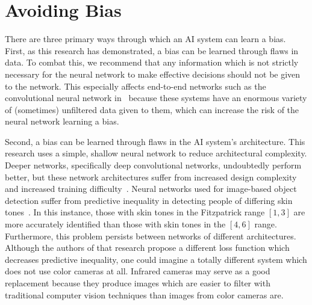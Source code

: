 \documentclass[]{report}
\begin{document}
\FloatBarrier
\section{Avoiding Bias}

There are three primary ways through which an AI system can learn a bias. First, as this research
has demonstrated, a bias can be learned through flaws in data. To combat this, we recommend that any
information which is not strictly necessary for the neural network to make effective decisions
should not be given to the network. This especially affects end-to-end networks such as the
convolutional neural network in~\cite{bojarski2016end} because these systems have an enormous
variety of (sometimes) unfiltered data given to them, which can increase the risk of the neural
network learning a bias.

Second, a bias can be learned through flaws in the AI system's architecture. This research uses a
simple, shallow neural network to reduce architectural complexity. Deeper networks, specifically
deep convolutional networks, undoubtedly perform better, but these network architectures suffer from
increased design complexity and increased training difficulty~\cite{mhaskar2016deep}. Neural
networks used for image-based object detection suffer from predictive inequality in detecting people
of differing skin tones~\cite{wilson2019predictive}. In this instance, those with skin tones in the
Fitzpatrick range $[1, 3]$ are more accurately identified than those with skin tones in the $[4, 6]$
range. Furthermore, this problem persists between networks of different architectures. Although the
authors of that research propose a different loss function which decreases predictive inequality,
one could imagine a totally different system which does not use color cameras at all. Infrared
cameras may serve as a good replacement because they produce images which are easier to filter with
traditional computer vision techniques than images from color cameras are.
\end{document}
